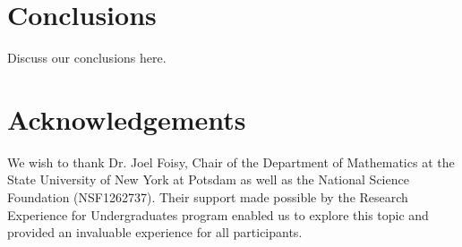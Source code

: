 

\section{Conclusions}

Discuss our conclusions here.

\section{Acknowledgements}

We wish to thank Dr. Joel Foisy, Chair of the Department of
Mathematics at the State University of New York at Potsdam as well as
the National Science Foundation (NSF1262737). Their support made
possible by the Research Experience for Undergraduates program enabled
us to explore this topic and provided an invaluable experience for all
participants.


